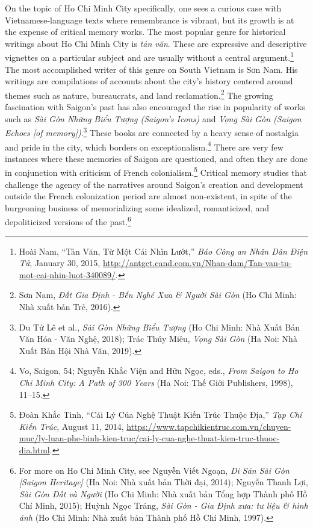 On the topic of Ho Chi Minh City specifically, one sees a curious case with Vietnamese-language texts where remembrance is vibrant, but its growth is at the expense of critical memory works. The most popular genre for historical writings about Ho Chi Minh City is \textit{tản văn}. These are expressive and descriptive vignettes on a particular subject and are usually without a central argument.\footnote{Hoài Nam, “Tản Văn, Từ Một Cái Nhìn Lướt,” \textit{Báo Công an Nhân Dân Điện Tử}, January 30, 2015, \url{http://antgct.cand.com.vn/Nhan-dam/Tan-van-tu-mot-cai-nhin-luot-340089/}.} The most accomplished writer of this genre on South Vietnam is Sơn Nam. His writings are compilations of accounts about the city’s history centered around themes such as nature, bureaucrats, and land reclamation.\footnote{Sơn Nam, \textit{Đất Gia Định - Bến Nghé Xưa \& Người Sài Gòn} (Ho Chi Minh: Nhà xuất bản Trẻ, 2016).} The growing fascination with Saigon’s past has also encouraged the rise in popularity of works such as \textit{Sài Gòn Những Biểu Tượng (Saigon’s Icons)} and \textit{Vọng Sài Gòn (Saigon Echoes [of memory])}.\footnote{Du Tử Lê et al., \textit{Sài Gòn Những Biểu Tượng} (Ho Chi Minh: Nhà Xuất Bản Văn Hóa - Văn Nghệ, 2018); Trác Thúy Miêu, \textit{Vọng Sài Gòn} (Ha Noi: Nhà Xuất Bản Hội Nhà Văn, 2019).} These books are connected by a heavy sense of nostalgia and pride in the city, which borders on exceptionalism.\footnote{Vo, Saigon, 54; Nguyễn Khắc Viện and Hữu Ngọc, eds., \textit{From Saigon to Ho Chi Minh City: A Path of 300 Years} (Ha Noi: Thế Giới Publishers, 1998), 11–15.} There are very few instances where these memories of Saigon are questioned, and often they are done in conjunction with criticism of French colonialism.\footnote{Đoàn Khắc Tình, “Cái Lý Của Nghệ Thuật Kiến Trúc Thuộc Địa,” \textit{Tạp Chí Kiến Trúc}, August 11, 2014, \url{https://www.tapchikientruc.com.vn/chuyen-muc/ly-luan-phe-binh-kien-truc/cai-ly-cua-nghe-thuat-kien-truc-thuoc-dia.html}.} Critical memory studies that challenge the agency of the narratives around Saigon’s creation and development outside the French colonization period are almost non-existent, in spite of the burgeoning business of memorializing some idealized, romanticized, and depoliticized versions of the past.\footnote{For more on Ho Chi Minh City, see Nguyễn Viết Ngoạn, \textit{Di Sản Sài Gòn [Saigon Heritage]} (Ha Noi: Nhà xuất bản Thời đại, 2014); Nguyễn Thanh Lợi, \textit{Sài Gòn Đất và Người} (Ho Chi Minh: Nhà xuất bản Tổng hợp Thành phố Hồ Chí Minh, 2015); Huỳnh Ngọc Trảng, \textit{Sài Gòn - Gia Định xưa: tư liệu \& hình ảnh} (Ho Chi Minh: Nhà xuất bản Thành phố Hồ Chí Minh, 1997).}

